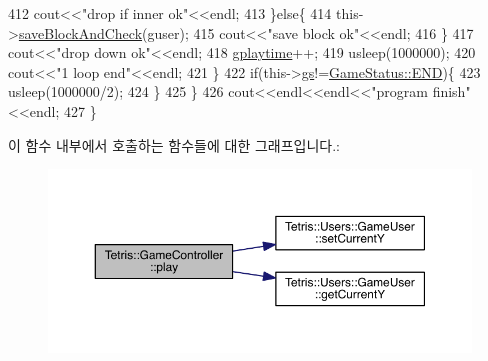 \begin{DoxyCode}
412                             cout<<\textcolor{stringliteral}{"drop if inner ok"}<<endl;
413                         \}\textcolor{keywordflow}{else}\{
414                             this->\hyperlink{class_tetris_1_1_game_controller_a3c63a9754e4cbeae4f66a5760bb4055d}{saveBlockAndCheck}(guser);
415                             cout<<\textcolor{stringliteral}{"save block ok"}<<endl;
416                         \}
417                         cout<<\textcolor{stringliteral}{"drop down ok"}<<endl;
418                         \hyperlink{class_tetris_1_1_game_controller_a562adcade20e362160535cd7248a2cce}{gplaytime}++;
419                         usleep(1000000);
420                         cout<<\textcolor{stringliteral}{"1 loop end"}<<endl;
421                     \}
422                     \textcolor{keywordflow}{if}(this->\hyperlink{class_tetris_1_1_game_controller_ae4c894005a82404c73a5a9a6efb208dc}{gs}!=\hyperlink{class_tetris_1_1_game_controller_a96a963b56385f3b3a122ff0ca2beb770ab1a326c06d88bf042f73d70f50197905}{GameStatus::END})\{
423                         usleep(1000000/2);
424                     \}
425                 \}
426                 cout<<endl<<endl<<\textcolor{stringliteral}{"program finish"}<<endl;
427             \}
\end{DoxyCode}
이 함수 내부에서 호출하는 함수들에 대한 그래프입니다.\+:
\nopagebreak
\begin{figure}[H]
\begin{center}
\leavevmode
\includegraphics[width=350pt]{db/dd2/class_tetris_1_1_game_controller_a766a7537d955c62969f2e4b7c0b3c73d_cgraph}
\end{center}
\end{figure}
\mbox{\label{class_tetris_1_1_game_controller_a5553ac767c6065148b7c332f59251e76}} 
